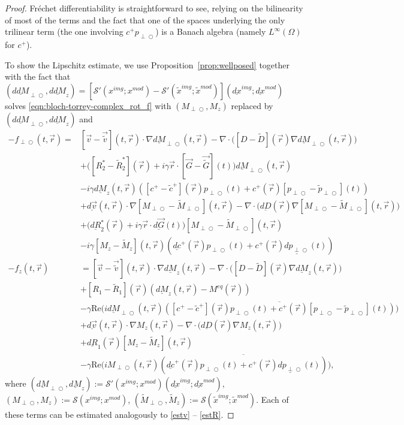 \documentclass{ws-m3as}
\newcommand{\uld}[1]{\underline{d#1}}
\renewcommand\Re{\mathrm{Re}}
\def\Mpp{M_{\perp\!\!\!\!\!\bigcirc}}
\def\Mpptil{\tilde{M}_{\perp\!\!\!\!\!\bigcirc}}
\def\pp{p_{\perp\!\!\!\!\!\bigcirc}}
\def\pptil{\tilde{p}_{\perp\!\!\!\!\!\bigcirc}}
\def\uldMpp{\uld{M}_{\perp\!\!\!\!\!\bigcirc}}
\def\ulddMpp{\uld{dM}_{\perp\!\!\!\!\!\bigcirc}}
\def\fpp{f_{\perp\!\!\!\!\!\bigcirc}}
\begin{document}
\begin{proof}
Fr\'{e}chet differentiability is straightforward to see, relying on the bilinearity of most of the terms and the fact that one of the spaces underlying the only trilinear term (the one involving ${c}^+\pp$) is a Banach algebra (namely $L^\infty(\Omega)$ for ${c}^+$). 

To show the Lipschitz estimate, we use Proposition~\ref{prop:wellposed} together with the fact that
$(\ulddMpp,\uld{dM}_z)=[\mathcal{S}'(x^{img};x^{mod})-\mathcal{S}'(\tilde{x}^{img};\tilde{x}^{mod})](\uld{x}^{img};\uld{x}^{mod})$ solves \eqref{eqn:bloch-torrey-complex_rot_f} with $(\Mpp,M_z)$ replaced by $(\ulddMpp,\uld{dM}_z)$ and 
\[
\begin{aligned}
-\fpp(t, \vec r)=& 
[{\vec v}-\vec{\tilde{v}}](t, \vec r)\cdot\nabla \uldMpp(t, \vec r) 
-\nabla\cdot\bigl([D-\tilde{D}](\vec r) \nabla \uldMpp(t, \vec r)\bigr) \\
&+\bigl([R_2^*-\tilde{R}_2^*](\vec r)+i\gamma\vec r \cdot [{\vec G}-\vec{\tilde{G}}](t)\bigr)\uldMpp(t, \vec r)\\
&-i\gamma \uld{M}_z(t, \vec r)([c^+-\tilde{c}^+](\vec r)\pp(t)+c^+(\vec r)[\pp-\pptil](t))\\
&+\uld{\vec v}(t, \vec r)\cdot\nabla [\Mpp-\Mpptil](t, \vec r) 
-\nabla\cdot\bigl(\uld{D}(\vec r) \nabla [\Mpp-\Mpptil](t, \vec r)\bigr) \\
&+\bigl(\uld{R}_2^*(\vec r)+i\gamma\vec r \cdot \uld{\vec G}(t)\bigr)[\Mpp-\Mpptil](t, \vec r)\\
&-i\gamma [M_z-\tilde{M}_z](t, \vec r)(\uld{c}^+(\vec r)\pp(t)+c^+(\vec r)\uld{\pp}(t))
\\[1ex]    
-f_z(t, \vec r)&
=[{\vec v}-\vec{\tilde{v}}](t, \vec r)\cdot\nabla \uld{M}_z(t, \vec r) 
-\nabla\cdot\bigl([D-\tilde{D}](\vec r) \nabla \uld{M}_z(t, \vec r)\bigr) \\
&+[R_1-\tilde{R}_1](\vec r) (\uld{M}_z(t, \vec r)-M^{eq}(\vec r))\\
&-\gamma\Re\bigl(i\uldMpp(t, \vec r)\overline{([c^+-\tilde{c}^+](\vec r)\pp(t)+c^+(\vec r)[\pp-\pptil](t))}\bigr)\\
&+\uld{\vec v}(t, \vec r)\cdot\nabla M_z(t, \vec r) -\nabla\cdot\bigl(\uld{D}(\vec r) \nabla M_z(t, \vec r)\bigr) \\
&+\uld{R}_1(\vec r) [M_z-\tilde{M}_z](t, \vec r)\\
&-\gamma\Re\bigl(i\Mpp(t, \vec r)\overline{(\uld{c}^+(\vec r)\pp(t)+c^+(\vec r)\uld{\pp}(t))}\bigr),
\end{aligned}
\]
where $(\uldMpp,\uld{M}_z):=\mathcal{S}'(x^{img};x^{mod})(\uld{x}^{img};\uld{x}^{mod})$,
$(\Mpp,M_z):=\mathcal{S}(x^{img};x^{mod})$,
$(\Mpptil,\tilde{M}_z):=\mathcal{S}(\tilde{x}^{img};\tilde{x}^{mod})$.
Each of these terms can be estimated analogously to \eqref{estv}
-- \eqref{estR}.
\end{proof}
\end{document}
